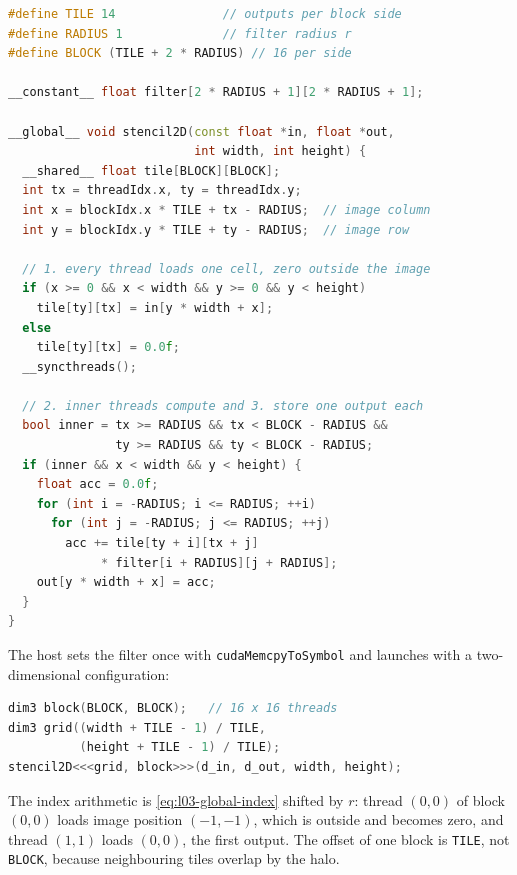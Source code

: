 \documentclass[../main.tex]{subfiles}
\begin{document}
\begin{lstlisting}[language=C++, numbers=none]
#define TILE 14               // outputs per block side
#define RADIUS 1              // filter radius r
#define BLOCK (TILE + 2 * RADIUS) // 16 per side

__constant__ float filter[2 * RADIUS + 1][2 * RADIUS + 1];

__global__ void stencil2D(const float *in, float *out,
                          int width, int height) {
  __shared__ float tile[BLOCK][BLOCK];
  int tx = threadIdx.x, ty = threadIdx.y;
  int x = blockIdx.x * TILE + tx - RADIUS;  // image column
  int y = blockIdx.y * TILE + ty - RADIUS;  // image row

  // 1. every thread loads one cell, zero outside the image
  if (x >= 0 && x < width && y >= 0 && y < height)
    tile[ty][tx] = in[y * width + x];
  else
    tile[ty][tx] = 0.0f;
  __syncthreads();

  // 2. inner threads compute and 3. store one output each
  bool inner = tx >= RADIUS && tx < BLOCK - RADIUS &&
               ty >= RADIUS && ty < BLOCK - RADIUS;
  if (inner && x < width && y < height) {
    float acc = 0.0f;
    for (int i = -RADIUS; i <= RADIUS; ++i)
      for (int j = -RADIUS; j <= RADIUS; ++j)
        acc += tile[ty + i][tx + j]
             * filter[i + RADIUS][j + RADIUS];
    out[y * width + x] = acc;
  }
}
\end{lstlisting}
The host sets the filter once with \texttt{cudaMemcpyToSymbol} and
launches with a two-dimensional configuration:
\begin{lstlisting}[language=C++, numbers=none]
dim3 block(BLOCK, BLOCK);   // 16 x 16 threads
dim3 grid((width + TILE - 1) / TILE,
          (height + TILE - 1) / TILE);
stencil2D<<<grid, block>>>(d_in, d_out, width, height);
\end{lstlisting}
The index arithmetic is \cref{eq:l03-global-index} shifted by $r$: thread
$(0,0)$ of block $(0,0)$ loads image position $(-1,-1)$, which is outside
and becomes zero, and thread $(1,1)$ loads $(0,0)$, the first output.
The offset of one block is \texttt{TILE}, not \texttt{BLOCK}, because
neighbouring tiles overlap by the halo.
\end{document}
